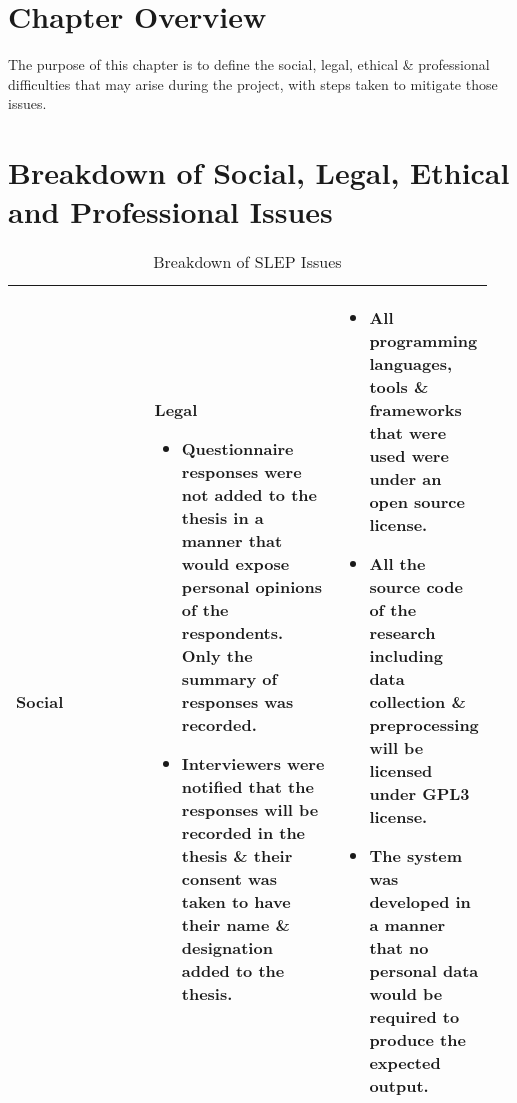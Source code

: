 \section{Chapter Overview}
The purpose of this chapter is to define the social, legal, ethical \& professional difficulties that may arise during the project, with steps taken to mitigate those issues.


\section{Breakdown of Social, Legal, Ethical and Professional Issues}

\vspace{-4mm}
\begin{longtable}{|p{0.473\linewidth}|p{0.473\linewidth}|}
\caption{Breakdown of SLEP Issues}\\ 
\hline
\textbf{Social} & \textbf{Legal} \endfirsthead 
\hline
\vspace{-7mm}       %
\begin{itemize}[leftmargin=*]
\item Questionnaire responses were not added to the thesis in a manner that would expose personal opinions of the respondents. Only the summary of responses was recorded.
\item Interviewers were notified that the responses will be recorded in the thesis \& their consent was taken to have their name \& designation added to the thesis.
\vspace{-7mm}       %
\end{itemize} & 
\vspace{-7mm}       %
\begin{itemize}[leftmargin=*]
\item All programming languages, tools \& frameworks that were used were under an open source license.
\item All the source code of the research including data collection \& preprocessing will be licensed under GPL3 license.
\item The system was developed in a manner that no personal data would be required to produce the expected output.
\vspace{-7mm}       %
\end{itemize}
\\ 
\hline


\end{longtable}
